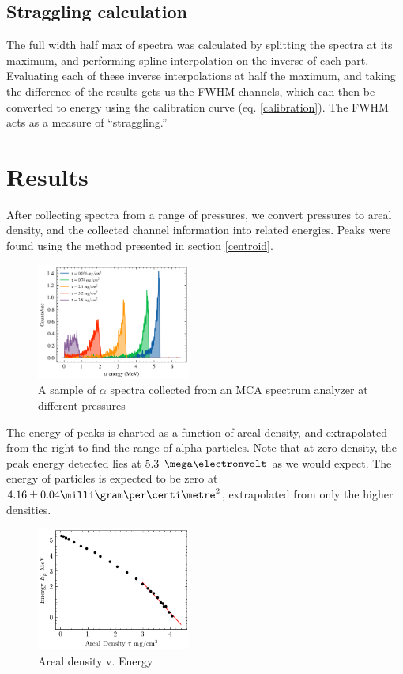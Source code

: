 \documentclass[12pt]{article}
\begin{document}
\begin{multicols}{2}
    \subsection{Straggling calculation}
    The full width half max of spectra was calculated by splitting the spectra at its maximum, and performing spline interpolation on the inverse of each part. Evaluating each of these inverse interpolations at half the maximum, and taking the difference of the results gets us the FWHM channels, which can then be converted to energy using the calibration curve (eq. \ref{calibration}). The FWHM acts as a measure of ``straggling.''

    \section{Results}

    After collecting spectra from a range of pressures, we convert pressures to areal density, and the collected channel information into related energies. Peaks were found using the method presented in section \ref{centroid}.
    \begin{figure}[H]
        \includegraphics[width=0.45\textwidth]{charts/spectra.png}
        \caption{A sample of $\alpha$ spectra collected from an MCA spectrum analyzer at different pressures}
    \end{figure}
    The energy of peaks is charted as a function of areal density, and extrapolated from the right to find the range of alpha particles. Note that at zero density, the peak energy detected lies at 5.3 $\mega \electronvolt$ as we would expect. The energy of particles is expected to be zero at $4.16 \pm 0.04 \milli\gram\per\centi \metre^2$, extrapolated from only the higher densities.
    \begin{figure}[H]
        \includegraphics[width=0.45\textwidth]{charts/Energy.png}
        \caption{Areal density v. Energy}
        \label{energy}
    \end{figure}


\end{multicols}
\end{document}
